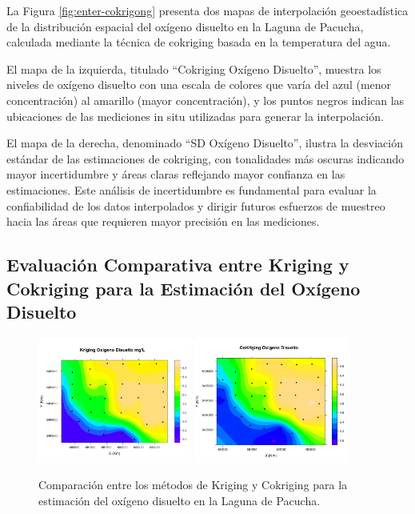 La Figura \ref{fig:enter-cokrigong} presenta dos mapas de interpolación geoestadística de la distribución espacial del oxígeno disuelto en la Laguna de Pacucha, calculada mediante la técnica de cokriging basada en la temperatura del agua. 

El mapa de la izquierda, titulado ``Cokriging Oxígeno Disuelto'', muestra los niveles de oxígeno disuelto con una escala de colores que varía del azul (menor concentración) al amarillo (mayor concentración), y los puntos negros indican las ubicaciones de las mediciones in situ utilizadas para generar la interpolación.

El mapa de la derecha, denominado ``SD Oxígeno Disuelto'', ilustra la desviación estándar de las estimaciones de cokriging, con tonalidades más oscuras indicando mayor incertidumbre y áreas claras reflejando mayor confianza en las estimaciones. Este análisis de incertidumbre es fundamental para evaluar la confiabilidad de los datos interpolados y dirigir futuros esfuerzos de muestreo hacia las áreas que requieren mayor precisión en las mediciones.


\subsection{ Evaluación Comparativa entre Kriging y Cokriging para la Estimación del Oxígeno Disuelto
}


\begin{figure}[h]
    \centering
    \includegraphics[width=0.45\textwidth]{Figuras_AED/ESTIMACION/KrigingOD.png} 
    \includegraphics[width=0.45\textwidth]{Figuras_AED/ESTIMACION/CoKriging_od.png} %
    \caption{Comparación entre los métodos de Kriging y Cokriging para la estimación del oxígeno disuelto en la Laguna de Pacucha.}
    \label{fig:kriging_cokrigingza1}
\end{figure}
  
